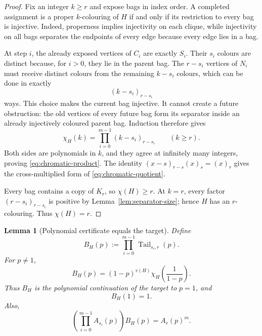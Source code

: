 \documentclass[11pt]{article}
\newtheorem{lemma}{Lemma}
\newcommand{\Tail}{\operatorname{Tail}}
\begin{document}
\begin{proof}
Fix an integer \(k\ge r\) and expose bags in index order.  A completed
assignment is a proper \(k\)-colouring of \(H\) if and only if its restriction
to every bag is injective.  Indeed, properness implies injectivity on each
clique, while injectivity on all bags separates the endpoints of every edge
because every edge lies in a bag.

At step \(i\), the already exposed vertices of \(C_i\) are exactly \(S_i\).
Their \(s_i\) colours are distinct because, for \(i>0\), they lie in the
parent bag.  The \(r-s_i\) vertices of \(N_i\) must receive distinct colours
from the remaining \(k-s_i\) colours, which can be done in exactly
\[
    (k-s_i)_{r-s_i}
\]
ways.  This choice makes the current bag injective.  It cannot create a
future obstruction: the old vertices of every future bag form its separator
inside an already injectively coloured parent bag.  Induction therefore gives
\[
    \chi_H(k)
    =
    \prod_{i=0}^{m-1}(k-s_i)_{r-s_i}
    \qquad(k\ge r).
\]
Both sides are polynomials in \(k\), and they agree at infinitely many
integers, proving \eqref{eq:chromatic-product}.  The identity
\((x-s)_{r-s}(x)_s=(x)_r\) gives the cross-multiplied form of
\eqref{eq:chromatic-quotient}.

Every bag contains a copy of \(K_r\), so \(\chi(H)\ge r\).  At \(k=r\), every
factor \((r-s_i)_{r-s_i}\) is positive by
Lemma~\ref{lem:separator-size}; hence \(H\) has an \(r\)-colouring.  Thus
\(\chi(H)=r\).
\end{proof}

\begin{lemma}[Polynomial certificate equals the target]\label{lem:target}
Define
\begin{equation}\label{eq:certificate}
    B_H(p)
    :=
    \prod_{i=0}^{m-1}\Tail_{s_i,r}(p).
\end{equation}
For \(p\ne1\),
\begin{equation}\label{eq:target-identity}
    B_H(p)
    =
    (1-p)^{v(H)}
    \chi_H\!\left(\frac1{1-p}\right).
\end{equation}
Thus \(B_H\) is the polynomial continuation of the target to \(p=1\), and
\[
    B_H(1)=1.
\]
Also,
\begin{equation}\label{eq:certificate-cross}
    \left(\prod_{i=0}^{m-1}A_{s_i}(p)\right)B_H(p)
    =
    A_r(p)^m.
\end{equation}
\end{lemma}
\end{document}
